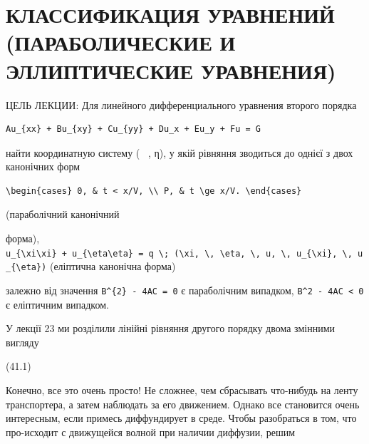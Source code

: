 \documentclass[
  ukrainian,
]{article}
\begin{document}
\section{\texorpdfstring{КЛАССИФИКАЦИЯ УРАВНЕНИЙ (ПАРАБОЛИЧЕСКИЕ И
ЭЛЛИПТИЧЕСКИЕ
\textbf{УРАВНЕНИЯ})}{КЛАССИФИКАЦИЯ УРАВНЕНИЙ (ПАРАБОЛИЧЕСКИЕ И ЭЛЛИПТИЧЕСКИЕ УРАВНЕНИЯ)}}\label{ux43aux43bux430ux441ux441ux438ux444ux438ux43aux430ux446ux438ux44f-ux443ux440ux430ux432ux43dux435ux43dux438ux439-ux43fux430ux440ux430ux431ux43eux43bux438ux447ux435ux441ux43aux438ux435-ux438-ux44dux43bux43bux438ux43fux442ux438ux447ux435ux441ux43aux438ux435-ux443ux440ux430ux432ux43dux435ux43dux438ux44f}

ЦЕЛЬ ЛЕКЦИИ: Для линейного дифференциального уравнения второго порядка

\begin{verbatim}
Au_{xx} + Bu_{xy} + Cu_{yy} + Du_x + Eu_y + Fu = G
\end{verbatim}

найти координатную систему (~ , η), у якій рівняння зводиться до однієї
з двох канонічних форм

\begin{verbatim}
\begin{cases} 0, & t < x/V, \\ P, & t \ge x/V. \end{cases}
\end{verbatim}

(параболічний канонічний

форма),
\texttt{u\_\{\textbackslash{}xi\textbackslash{}xi\}\ +\ u\_\{\textbackslash{}eta\textbackslash{}eta\}\ =\ q\ \textbackslash{};\ (\textbackslash{}xi,\ \textbackslash{},\ \textbackslash{}eta,\ \textbackslash{},\ u,\ \textbackslash{},\ u\_\{\textbackslash{}xi\},\ \textbackslash{},\ u\_\{\textbackslash{}eta\})}
(еліптична канонічна форма)

залежно від значення \texttt{B\^{}\{2\}\ -\ 4AC\ =\ 0} є параболічним
випадком, \texttt{B\^{}2\ -\ 4AC\ \textless{}\ 0} є еліптичним випадком.

У лекції 23 ми розділили лінійні рівняння другого порядку двома змінними
вигляду

(41.1)

Конечно, все это очень просто! Не сложнее, чем сбрасывать что-нибудь на
ленту транспортера, а затем наблюдать за его движением. Однако все
становится очень интересным, если примесь диффундирует в среде. Чтобы
разобраться в том, что про-исходит с движущейся волной при наличии
диффузии, решим
\end{document}
